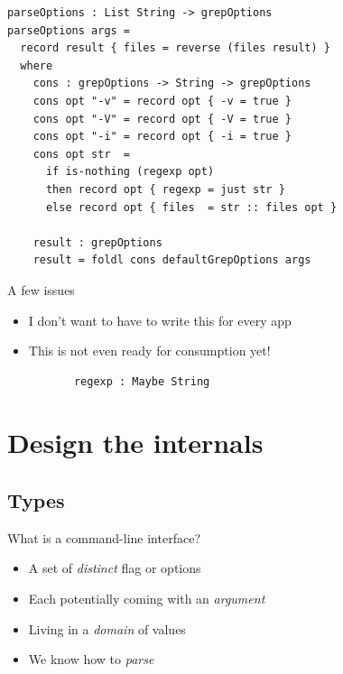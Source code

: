 \documentclass[dvipsnames]{beamer}
\begin{document}
\begin{frame}[fragile]
\begin{verbatim}
parseOptions : List String -> grepOptions
parseOptions args =
  record result { files = reverse (files result) }
  where
    cons : grepOptions -> String -> grepOptions
    cons opt "-v" = record opt { -v = true }
    cons opt "-V" = record opt { -V = true }
    cons opt "-i" = record opt { -i = true }
    cons opt str  =
      if is-nothing (regexp opt)
      then record opt { regexp = just str }
      else record opt { files  = str :: files opt }

    result : grepOptions
    result = foldl cons defaultGrepOptions args
\end{verbatim}
\end{frame}

\begin{frame}[fragile]{A few issues}
  \begin{itemize}
    \item I don't want to have to write this for every app
    \item This is not even ready for consumption yet!
      \begin{verbatim}
       regexp : Maybe String
      \end{verbatim}
  \end{itemize}
\end{frame}

\section{Design the internals}
\subsection{Types}

\begin{frame}{What is a command-line interface?}

  \begin{itemize}
    \item A set of \emph{distinct} flag or options
    \item Each potentially coming with an \emph{argument}
    \item Living in a \emph{domain} of values
    \item We know how to \emph{parse}
  \end{itemize}
\end{frame}
\end{document}
